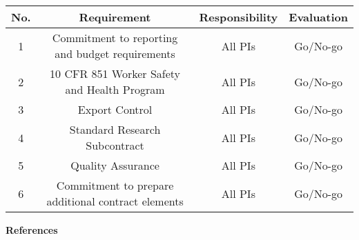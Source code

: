 \documentclass[11pt,letterpaper]{article}
\begin{document}
\vspace{0.5\baselineskip}

\begin{table}[h!]
    \centering
    \begin{tabular}{|c|c|c|c|}
        \hline
        \textbf{No.}
        &\textbf{Requirement}
        &\textbf{Responsibility}
        &\textbf{Evaluation}
        \\
        \hline
        1
        &Commitment to reporting and budget requirements
        &All PIs
        &Go/No-go 
        \\
        \hline
        2
        &10 CFR 851 Worker Safety and Health Program
        &All PIs
        &Go/No-go 
        \\
        \hline
        3
        &Export Control
        &All PIs
        &Go/No-go 
        \\
        \hline
        4
        &Standard Research Subcontract
        &All PIs
        &Go/No-go 
        \\
        \hline
        5
        &Quality Assurance
        &All PIs
        &Go/No-go 
        \\
        \hline
        6
        &Commitment to prepare additional contract elements
        &All PIs
        &Go/No-go 
        \\
        \hline
    \end{tabular}
    \label{tab-mandatory-requirements}
\end{table}
        
\vspace{0.5\baselineskip}
        
\noindent\textbf{References}

\setlength{\bibhang}{0pt}

\end{document}
